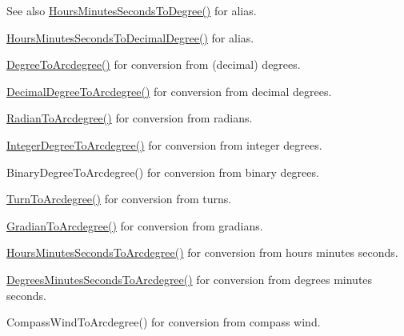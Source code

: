 \begin{DoxySeeAlso}{See also}
\mbox{\hyperlink{group___e_g_x_math-_angle_conversions-_hours_minutes_seconds_ga4f66698550a0cf0fd326f25aba2c0d80}{Hours\+Minutes\+Seconds\+To\+Degree()}} for alias. 

\mbox{\hyperlink{group___e_g_x_math-_angle_conversions-_hours_minutes_seconds_gad6662d1113ae8aea6baca6317888b4cd}{Hours\+Minutes\+Seconds\+To\+Decimal\+Degree()}} for alias. 

\mbox{\hyperlink{group___e_g_x_math-_angle_conversions-_degree_gac1b5f3b68f66c77a6df4ceef842c9b19}{Degree\+To\+Arcdegree()}} for conversion from (decimal) degrees. 

\mbox{\hyperlink{group___e_g_x_math-_angle_conversions-_decimal_degree_gacdd463fcabffeb598ebda65b012ce743}{Decimal\+Degree\+To\+Arcdegree()}} for conversion from decimal degrees. 

\mbox{\hyperlink{group___e_g_x_math-_angle_conversions-_radian_ga3dfdc97357cc07f8379976bbc08f9852}{Radian\+To\+Arcdegree()}} for conversion from radians. 

\mbox{\hyperlink{group___e_g_x_math-_angle_conversions-_integer_degree_gaf633d0b82bfb7586ce86ffbcf78d8f7a}{Integer\+Degree\+To\+Arcdegree()}} for conversion from integer degrees. 

Binary\+Degree\+To\+Arcdegree() for conversion from binary degrees. 

\mbox{\hyperlink{group___e_g_x_math-_angle_conversions-_turn_ga7bdc3a81ce316dd47b1a3179489fa195}{Turn\+To\+Arcdegree()}} for conversion from turns. 

\mbox{\hyperlink{group___e_g_x_math-_angle_conversions-_gradian_gacd0b1797f2460944dcbc541a855ec21c}{Gradian\+To\+Arcdegree()}} for conversion from gradians. 

\mbox{\hyperlink{group___e_g_x_math-_angle_conversions-_hours_minutes_seconds_ga3c38143df47da88534ddbd13726748e2}{Hours\+Minutes\+Seconds\+To\+Arcdegree()}} for conversion from hours minutes seconds. 

\mbox{\hyperlink{group___e_g_x_math-_angle_conversions-_degrees_minutes_seconds_ga71fd0a3b9238a3a4fde150802938dee8}{Degrees\+Minutes\+Seconds\+To\+Arcdegree()}} for conversion from degrees minutes seconds. 

Compass\+Wind\+To\+Arcdegree() for conversion from compass wind. 
\end{DoxySeeAlso}
\mbox{\label{group___e_g_x_math-_angle_conversions-_hours_minutes_seconds_ga23bfa5abeb014726c2e2ac6303be5dae}} 
